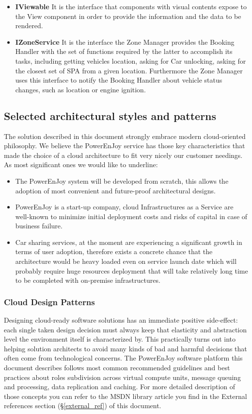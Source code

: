 \begin{itemize}
    \item\textbf{IViewable}\newline
    It is the interface that components with visual contents expose to the View component in order to provide the information and the data to be rendered.
    \item\textbf{IZoneService}\newline
    It is the interface the Zone Manager provides the Booking Handler with the set of functions required by the latter to accomplish its tasks, including getting vehicles location, asking for Car unlocking, asking for the closest set of SPA from a given location. Furthermore the Zone Manager uses this interface to notify the Booking Handler about vehicle status changes, such as location or engine ignition.
\end{itemize}


\subsection{Selected architectural styles and patterns}
The solution described in this document strongly embrace modern cloud-oriented philosophy. We believe the PowerEnJoy service has those key characteristics that made the choice of a cloud architecture to fit very nicely our customer needings.
As most significant ones we would like to underline:
\begin{itemize}
    \item The PowerEnJoy system will be developed from scratch, this allows the adoption of most convenient and future-proof architectural designs.
    \item PowerEnJoy is a start-up company, cloud Infrastructures as a Service are well-known to minimize initial deployment costs and risks of capital in case of business failure.
    \item Car sharing services, at the moment are experiencing a significant growth in terms of user adoption, therefore exists a concrete chance that the architecture would be heavy loaded even on service launch date which will probably require huge resources deployment that will take relatively long time to be completed with on-premise infrastructures.
\end{itemize}
\subsubsection{Cloud Design Patterns}
Designing cloud-ready software solutions has an immediate positive side-effect: each single taken design decision must always keep that elasticity and abstraction level the environment itself is characterized by. This practically turns out into helping solution architects to avoid many kinds of bad and harmful decisions that often come from technological concerns. The PowerEnJoy software platform this document describes follows most common recommended guidelines and best practices about roles subdivision across virtual compute units, message queuing and processing, data replication and caching. For more detailed description of those concepts you can refer to the MSDN library article you find in the External references section (§\ref{external_ref}) of this document.


